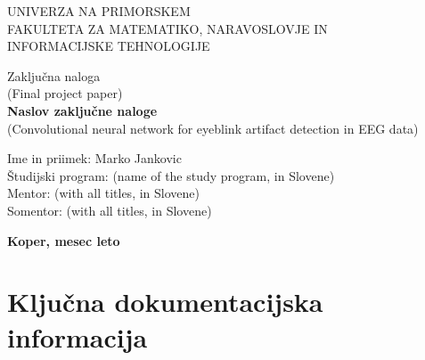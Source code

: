 \documentclass[12pt,a4paper,titlepage,openany]{report}
\begin{document}
\pagestyle{empty}
\begin{center}
\noindent \large UNIVERZA NA PRIMORSKEM\\
\large FAKULTETA ZA MATEMATIKO, NARAVOSLOVJE IN\\
INFORMACIJSKE TEHNOLOGIJE


\normalsize
\vspace{5.5cm}
Zaklju\v cna naloga\\
(Final project paper)\\
\textbf{\large Naslov zaklju\v cne naloge}\\
\normalsize
(Convolutional neural network for eyeblink artifact detection in EEG data)\\
\end{center}

\begin{flushleft}
\vspace{5cm}
\noindent Ime in priimek: Marko Jankovic
\\
\noindent \v Studijski program: (name of the study program, in Slovene)
\\
\noindent Mentor: (with all titles, in Slovene)
\\
\noindent Somentor: (with all titles, in Slovene)
\\
\end{flushleft}

\vspace{4cm}
\begin{center}
\large \textbf{Koper, mesec leto}
\end{center}
\newpage

\pagestyle{fancy}

\section*{Klju\v cna dokumentacijska informacija}
\end{document}
